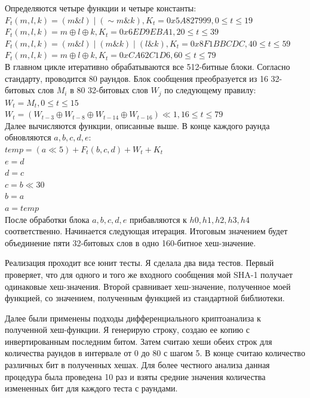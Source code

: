\documentclass[12pt]{article}
\begin{document}
Определяются четыре функции и четыре константы:\\
$ F_{t}(m, l, k) = (m \& l) \mid (\sim m \& k), K_{t} = 0x5A827999, 0 \leq t \leq 19$\\
$ F_{t}(m, l, k) = m \oplus l \oplus k, K_{t} = 0x6ED9EBA1, 20 \leq t \leq 39$\\
$ F_{t}(m, l, k) = (m \& l) \mid (m \& k) \mid  (l \& k), K_{t} = 0x8F1BBCDC, 40 \leq t \leq 59$\\
$ F_{t}(m, l, k) = m \oplus l \oplus k, K_{t} = 0xCA62C1D6, 60 \leq t \leq 79$\\

В главном цикле итеративно обрабатываются все 512-битные блоки. Согласно стандарту, проводится 80 раундов. Блок сообщения преобразуется из 16 32-битовых слов $M_{i}$ в 80 32-битовых слов $W_{j}$ по следующему правилу: \\
$W_{t} = M_{t}, 0 \leq t \leq 15 $\\
$W_{t} = (W_{t-3} \oplus W_{t-8} \oplus W_{t-14} \oplus W_{t-16}) \ll 1, 16 \leq t \leq 79$\\

Далее вычисляются функции, описанные выше. В конце каждого раунда обновляются $a, b, c, d, e$:\\
$ temp = (a \ll 5) + F_{t}(b, c, d) + W_{t} + K_{t} $\\
$ e = d $ \\
$ d = c $ \\
$ c = b \ll 30 $ \\
$ b = a $ \\
$ a = temp $ \\

После обработки блока $a, b, c, d, e$ прибавляются к $h0, h1, h2, h3, h4$ соответственно. Начинается следующая итерация. Итоговым значением будет объединение пяти 32-битовых слов в одно 160-битное хеш-значение.

\par
Реализация проходит все юнит тесты. Я сделала два вида тестов. Первый проверяет, что для одного и того же входного сообщения мой SHA-1 получает одинаковые хеш-значения. Второй сравнивает хеш-значение, полученное моей функцией, со значением, полученным функцией из стандартной библиотеки. \par

\par
Далее были применены подходы дифференциального криптоанализа к полученной хеш-функции. Я генерирую строку, создаю ее копию с инвертированным последним битом. Затем считаю хеши обеих строк для количества раундов в интервале от 0 до 80 с шагом 5. В конце считаю количество различных бит в полученных хешах. Для более честного анализа данная процедура была проведена 10 раз и взяты средние значения количества измененных бит для каждого теста с раундами. \par
\end{document}
